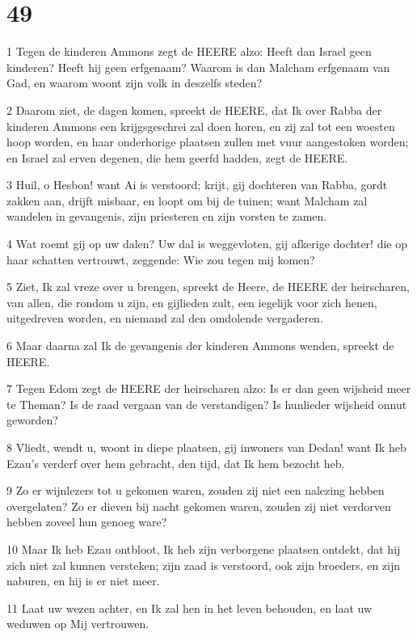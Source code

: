 \chapter{49}

\par 1 Tegen de kinderen Ammons zegt de HEERE alzo: Heeft dan Israel geen kinderen? Heeft hij geen erfgenaam? Waarom is dan Malcham erfgenaam van Gad, en waarom woont zijn volk in deszelfs steden?
\par 2 Daarom ziet, de dagen komen, spreekt de HEERE, dat Ik over Rabba der kinderen Ammons een krijgsgeschrei zal doen horen, en zij zal tot een woesten hoop worden, en haar onderhorige plaatsen zullen met vuur aangestoken worden; en Israel zal erven degenen, die hem geerfd hadden, zegt de HEERE.
\par 3 Huil, o Hesbon! want Ai is verstoord; krijt, gij dochteren van Rabba, gordt zakken aan, drijft misbaar, en loopt om bij de tuinen; want Malcham zal wandelen in gevangenis, zijn priesteren en zijn vorsten te zamen.
\par 4 Wat roemt gij op uw dalen? Uw dal is weggevloten, gij afkerige dochter! die op haar schatten vertrouwt, zeggende: Wie zou tegen mij komen?
\par 5 Ziet, Ik zal vreze over u brengen, spreekt de Heere, de HEERE der heirscharen, van allen, die rondom u zijn, en gijlieden zult, een iegelijk voor zich henen, uitgedreven worden, en niemand zal den omdolende vergaderen.
\par 6 Maar daarna zal Ik de gevangenis der kinderen Ammons wenden, spreekt de HEERE.
\par 7 Tegen Edom zegt de HEERE der heirscharen alzo: Is er dan geen wijsheid meer te Theman? Is de raad vergaan van de verstandigen? Is hunlieder wijsheid onnut geworden?
\par 8 Vliedt, wendt u, woont in diepe plaatsen, gij inwoners van Dedan! want Ik heb Ezau's verderf over hem gebracht, den tijd, dat Ik hem bezocht heb.
\par 9 Zo er wijnlezers tot u gekomen waren, zouden zij niet een nalezing hebben overgelaten? Zo er dieven bij nacht gekomen waren, zouden zij niet verdorven hebben zoveel hun genoeg ware?
\par 10 Maar Ik heb Ezau ontbloot, Ik heb zijn verborgene plaatsen ontdekt, dat hij zich niet zal kunnen versteken; zijn zaad is verstoord, ook zijn broeders, en zijn naburen, en hij is er niet meer.
\par 11 Laat uw wezen achter, en Ik zal hen in het leven behouden, en laat uw weduwen op Mij vertrouwen.
